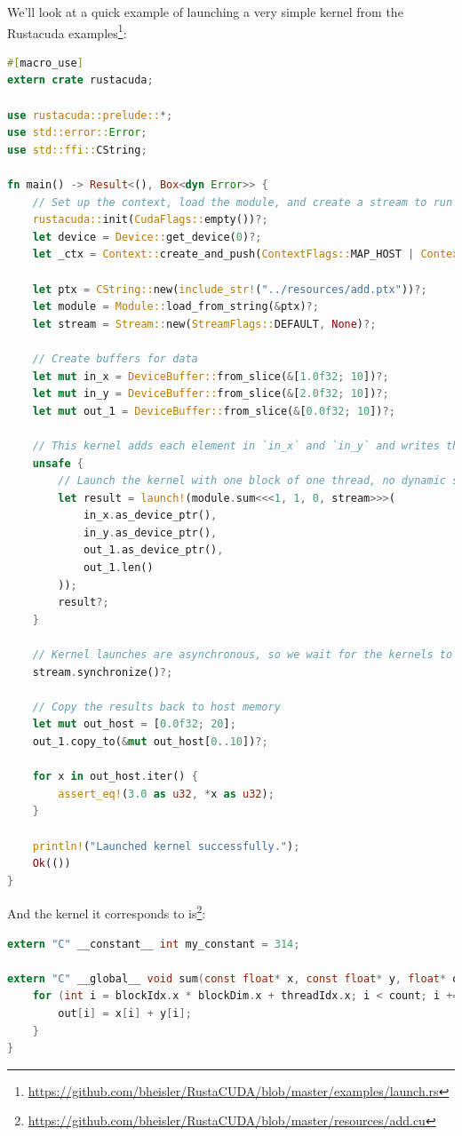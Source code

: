 \documentclass[a4paper]{report}
\begin{document}
We'll look at a quick example of launching a very simple kernel from the Rustacuda examples\footnote{\url{https://github.com/bheisler/RustaCUDA/blob/master/examples/launch.rs}}: 
\begin{lstlisting}[language=Rust]
#[macro_use]
extern crate rustacuda;

use rustacuda::prelude::*;
use std::error::Error;
use std::ffi::CString;

fn main() -> Result<(), Box<dyn Error>> {
    // Set up the context, load the module, and create a stream to run kernels in.
    rustacuda::init(CudaFlags::empty())?;
    let device = Device::get_device(0)?;
    let _ctx = Context::create_and_push(ContextFlags::MAP_HOST | ContextFlags::SCHED_AUTO, device)?;

    let ptx = CString::new(include_str!("../resources/add.ptx"))?;
    let module = Module::load_from_string(&ptx)?;
    let stream = Stream::new(StreamFlags::DEFAULT, None)?;

    // Create buffers for data
    let mut in_x = DeviceBuffer::from_slice(&[1.0f32; 10])?;
    let mut in_y = DeviceBuffer::from_slice(&[2.0f32; 10])?;
    let mut out_1 = DeviceBuffer::from_slice(&[0.0f32; 10])?;

    // This kernel adds each element in `in_x` and `in_y` and writes the result into `out`.
    unsafe {
        // Launch the kernel with one block of one thread, no dynamic shared memory on `stream`.
        let result = launch!(module.sum<<<1, 1, 0, stream>>>(
            in_x.as_device_ptr(),
            in_y.as_device_ptr(),
            out_1.as_device_ptr(),
            out_1.len()
        ));
        result?;
    }

    // Kernel launches are asynchronous, so we wait for the kernels to finish executing.
    stream.synchronize()?;

    // Copy the results back to host memory
    let mut out_host = [0.0f32; 20];
    out_1.copy_to(&mut out_host[0..10])?;

    for x in out_host.iter() {
        assert_eq!(3.0 as u32, *x as u32);
    }

    println!("Launched kernel successfully.");
    Ok(())
}
\end{lstlisting}

And the kernel it corresponds to is\footnote{\url{https://github.com/bheisler/RustaCUDA/blob/master/resources/add.cu}}:
\begin{lstlisting}[language=C]
extern "C" __constant__ int my_constant = 314;

extern "C" __global__ void sum(const float* x, const float* y, float* out, int count) {
    for (int i = blockIdx.x * blockDim.x + threadIdx.x; i < count; i += blockDim.x * gridDim.x) {
        out[i] = x[i] + y[i];
    }
}
\end{lstlisting}
\end{document}
